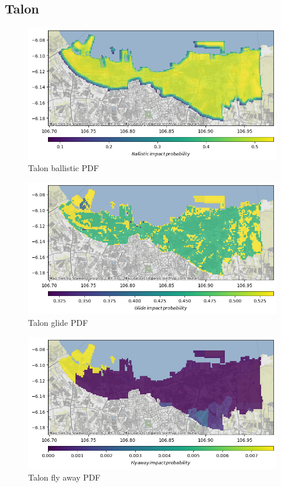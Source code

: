 \documentclass[12pt]{report}
\begin{document}
        \subsection{Talon}
        \begin{figure}[H]
            \centering
            \includegraphics[width=\textwidth]{Plot/talon/ballistic_fpdf.png}
            \caption{Talon ballistic PDF}
        \end{figure}
        \begin{figure}[H]
            \centering
            \includegraphics[width=\textwidth]{Plot/talon/glide_pdf.png}
            \caption{Talon glide PDF}
        \end{figure}
        \begin{figure}[H]
            \centering
            \includegraphics[width=\textwidth]{Plot/talon/fly_away_pdf.png}
            \caption{Talon fly away PDF}
        \end{figure}
\end{document}
